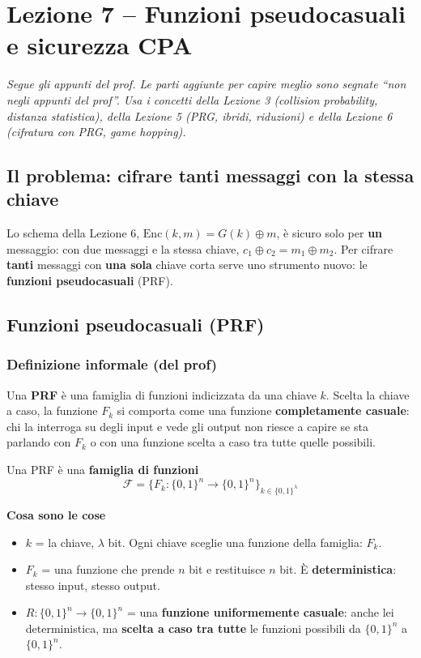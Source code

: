 \chapter{Lezione 7 -- Funzioni pseudocasuali e sicurezza CPA}

\emph{Segue gli appunti del prof. Le parti aggiunte per capire meglio sono segnate ``non negli appunti del prof''. Usa i concetti della Lezione 3 (collision probability, distanza statistica), della Lezione 5 (PRG, ibridi, riduzioni) e della Lezione 6 (cifratura con PRG, game hopping).}

\section{Il problema: cifrare tanti messaggi con la stessa chiave}

\begin{inbreve}
Lo schema della Lezione 6, \(\text{Enc}(k, m) = G(k) \oplus m\), è sicuro solo per \textbf{un} messaggio: con due messaggi e la stessa chiave, \(c_1 \oplus c_2 = m_1 \oplus m_2\). Per cifrare \textbf{tanti} messaggi con \textbf{una sola} chiave corta serve uno strumento nuovo: le \textbf{funzioni pseudocasuali} (PRF).
\end{inbreve}

\section{Funzioni pseudocasuali (PRF)}

\subsection{Definizione informale (del prof)}

\begin{inbreve}
Una \textbf{PRF} è una famiglia di funzioni indicizzata da una chiave \(k\). Scelta la chiave a caso, la funzione \(F_k\) si comporta come una funzione \textbf{completamente casuale}: chi la interroga su degli input e vede gli output non riesce a capire se sta parlando con \(F_k\) o con una funzione scelta a caso tra tutte quelle possibili.
\end{inbreve}

Una PRF è una \textbf{famiglia di funzioni}
\[
\mathcal{F} = \{ F_k : \{0,1\}^n \to \{0,1\}^n \}_{k \in \{0,1\}^\lambda}
\]

\begin{nota}
\textbf{Cosa sono le cose}
\begin{itemize}
  \item \(k\) = la chiave, \(\lambda\) bit. Ogni chiave sceglie una funzione della famiglia: \(F_k\).
  \item \(F_k\) = una funzione che prende \(n\) bit e restituisce \(n\) bit. È \textbf{deterministica}: stesso input, stesso output.
  \item \(R : \{0,1\}^n \to \{0,1\}^n\) = una \textbf{funzione uniformemente casuale}: anche lei deterministica, ma \textbf{scelta a caso tra tutte} le funzioni possibili da \(\{0,1\}^n\) a \(\{0,1\}^n\).
\end{itemize}
\end{nota}

